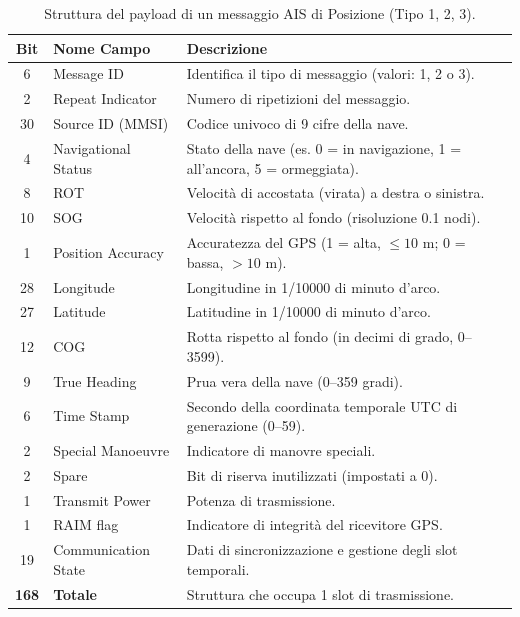 \begin{table}[htbp]
\centering
\small
\begin{tabularx}{\textwidth}{c l >{\raggedright\arraybackslash}X}
\toprule
\textbf{Bit} & \textbf{Nome Campo} & \textbf{Descrizione} \\
\midrule
6  & Message ID & Identifica il tipo di messaggio (valori: 1, 2 o 3). \\
2  & Repeat Indicator & Numero di ripetizioni del messaggio. \\
30 & Source ID (\ac{MMSI}) & Codice univoco di 9 cifre della nave. \\
4  & Navigational Status & Stato della nave (es. 0 = in navigazione, 1 = all'ancora, 5 = ormeggiata). \\
8  & \ac{ROT} & Velocità di accostata (virata) a destra o sinistra. \\
10 & \ac{SOG} & Velocità rispetto al fondo (risoluzione 0.1 nodi). \\
1  & Position Accuracy & Accuratezza del \ac{GPS} (1 = alta, $\le 10 \text{ m}$; 0 = bassa, $> 10 \text{ m}$). \\
28 & Longitude & Longitudine in 1/10000 di minuto d'arco. \\
27 & Latitude & Latitudine in 1/10000 di minuto d'arco. \\
12 & \ac{COG} & Rotta rispetto al fondo (in decimi di grado, 0--3599). \\
9  & True Heading & Prua vera della nave (0--359 gradi). \\
6  & Time Stamp & Secondo della coordinata temporale \ac{UTC} di generazione (0--59). \\
2  & Special Manoeuvre & Indicatore di manovre speciali. \\
2  & Spare & Bit di riserva inutilizzati (impostati a 0). \\
1  & Transmit Power & Potenza di trasmissione. \\
1  & RAIM flag & Indicatore di integrità del ricevitore \ac{GPS}. \\
19 & Communication State & Dati di sincronizzazione e gestione degli slot temporali. \\
\midrule
\textbf{168} & \textbf{Totale} & Struttura che occupa 1 slot di trasmissione. \\
\bottomrule
\end{tabularx}
\caption{Struttura del payload di un messaggio \ac{AIS} di Posizione (Tipo 1, 2, 3).}
\label{tab:struttura_ais}
\end{table}
\newpage

